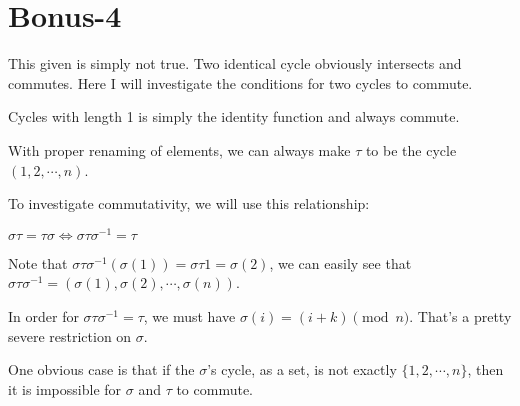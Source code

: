 \section*{Bonus-4}
This given is simply not true. Two identical cycle obviously intersects and commutes. Here I will investigate the conditions for two cycles to commute.

Cycles with length 1 is simply the identity function and always commute.

With proper renaming of elements, we can always make $ \tau $ to be the cycle $ (1, 2, \cdots, n ) $. 

To investigate commutativity, we will use this relationship:

$ \sigma \tau = \tau \sigma \iff \sigma \tau \sigma^{-1} = \tau $

Note that $ \sigma \tau \sigma^{-1} (\sigma(1)) = \sigma \tau 1 = \sigma (2) $, we can easily see that $ \sigma \tau \sigma^{-1} = (\sigma(1), \sigma(2), \cdots, \sigma(n)) $.

In order for $ \sigma \tau \sigma^{-1} = \tau $, we must have $ \sigma(i) = (i + k) \pmod n $. That's a pretty severe restriction on $ \sigma $.

One obvious case is that if the $ \sigma $'s cycle, as a set, is not exactly $ \{1, 2, \cdots, n \} $, then it is impossible for $ \sigma $ and $ \tau $ to commute.